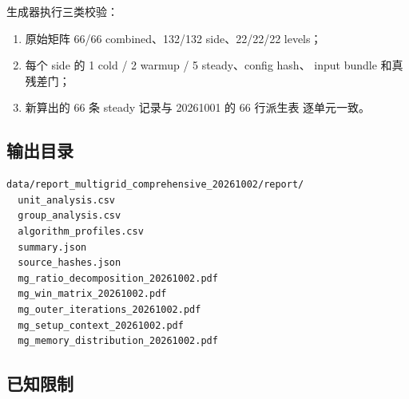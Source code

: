 \documentclass[UTF8,a4paper,11pt]{ctexart}
\begin{document}
生成器执行三类校验：

\begin{enumerate}[leftmargin=2em]
  \item 原始矩阵 66/66 combined、132/132 side、22/22/22 levels；
  \item 每个 side 的 1 cold / 2 warmup / 5 steady、config hash、
        input bundle 和真残差门；
  \item 新算出的 66 条 steady 记录与 20261001 的 66 行派生表
        逐单元一致。
\end{enumerate}

\subsection{输出目录}

\begin{verbatim}
data/report_multigrid_comprehensive_20261002/report/
  unit_analysis.csv
  group_analysis.csv
  algorithm_profiles.csv
  summary.json
  source_hashes.json
  mg_ratio_decomposition_20261002.pdf
  mg_win_matrix_20261002.pdf
  mg_outer_iterations_20261002.pdf
  mg_setup_context_20261002.pdf
  mg_memory_distribution_20261002.pdf
\end{verbatim}

\subsection{已知限制}
\end{document}
